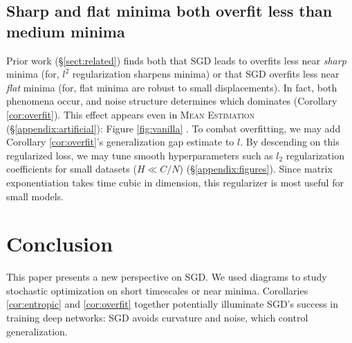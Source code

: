 \documentclass[anon,12pt]{colt2021} %
\newcommand{\ofsix}[1]{
    {\tiny \raisebox{0.04cm}{$\substack{
        \ifthenelse{\equal{#1}{0}}{{\color{moor}\blacksquare}}{\square}
        \ifthenelse{\equal{#1}{2}}{{\color{moor}\blacksquare}}{\square}    
        \ifthenelse{\equal{#1}{4}}{{\color{moor}\blacksquare}}{\square} \\
        \ifthenelse{\equal{#1}{1}}{{\color{moor}\blacksquare}}{\square}    
        \ifthenelse{\equal{#1}{3}}{{\color{moor}\blacksquare}}{\square}
        \ifthenelse{\equal{#1}{5}}{{\color{moor}\blacksquare}}{\square}
    }$}}%
}
\newcommand{\MeanEstimation}{\textsc{Mean Estimation}}
\begin{document}
    
        \subsection{Sharp and flat minima both overfit less than medium minima} \label{subsect:overfit}
    
            Prior work (\S\ref{sect:related}) finds both that SGD leads to
            overfits less near \emph{sharp} minima (for, $l^2$ regularization
            sharpens minima) or that SGD overfits less near \emph{flat} minima
            (for, flat minima are robust to small displacements).  In fact,
            both phenomena occur, and noise structure determines which
            dominates (Corollary \ref{cor:overfit}).  This effect appears even
            in \MeanEstimation\, (\S\ref{appendix:artificial}): Figure
            \ref{fig:vanilla}\ofsix{5}.
            To combat overfitting, we may add Corollary \ref{cor:overfit}'s
            generalization gap estimate to $l$.  By descending on this
            regularized loss, we may tune smooth hyperparameters such as $l_2$
            regularization coefficients for small datasets ($H \ll C/N$)
            (\S\ref{appendix:figures}).  Since matrix exponentiation takes time
            cubic in dimension, this regularizer is most useful for small
            models.

    \section{Conclusion}


    
            This paper presents a new perspective on SGD. 
            We used diagrams to study stochastic optimization on short timescales
            or near minima.  Corollaries \ref{cor:entropic} and \ref{cor:overfit}
            together potentially illuminate SGD's success in training deep networks:
            SGD avoids curvature and noise, which control generalization.
\end{document}
